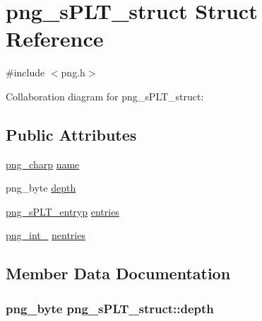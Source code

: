 \hypertarget{structpng__sPLT__struct}{}\section{png\+\_\+s\+P\+L\+T\+\_\+struct Struct Reference}
\label{structpng__sPLT__struct}


{\ttfamily \#include $<$png.\+h$>$}



Collaboration diagram for png\+\_\+s\+P\+L\+T\+\_\+struct\+:
\subsection*{Public Attributes}
\begin{DoxyCompactItemize}
\item 
\hyperlink{pngconf_8h_a0d08bb02251d02830803ff5d2d449750}{png\+\_\+charp} \hyperlink{structpng__sPLT__struct_af3b088b149e790b9b98ebedde69a70f0}{name}
\item 
png\+\_\+byte \hyperlink{structpng__sPLT__struct_a6e667882cd16c9675455cebd49898b22}{depth}
\item 
\hyperlink{png_8h_a876dffcd144a34db6e32f9648f032d6e}{png\+\_\+s\+P\+L\+T\+\_\+entryp} \hyperlink{structpng__sPLT__struct_a4c7db13fb1a7f0ede434e174b20151ec}{entries}
\item 
\hyperlink{pngrutil_8c_a1f5cf5f6a913e237d8a9a7c0a6ea1714}{png\+\_\+int\+\_} \hyperlink{structpng__sPLT__struct_ac5844e98e4c43733bad6b83b54dc7a9f}{nentries}
\end{DoxyCompactItemize}


\subsection{Member Data Documentation}
\hypertarget{structpng__sPLT__struct_a6e667882cd16c9675455cebd49898b22}{}
\subsubsection[{depth}]{\setlength{\rightskip}{0pt plus 5cm}png\+\_\+byte png\+\_\+s\+P\+L\+T\+\_\+struct\+::depth}\label{structpng__sPLT__struct_a6e667882cd16c9675455cebd49898b22}
\hypertarget{structpng__sPLT__struct_a4c7db13fb1a7f0ede434e174b20151ec}{}

